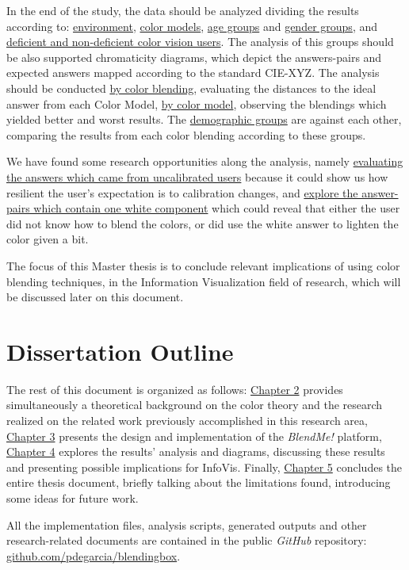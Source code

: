 %
In the end of the study, the data should be analyzed dividing the results according to: \ul{environment}, \ul{color
models}, \ul{age groups} and \ul{gender groups}, and \ul{deficient and non-deficient color vision users}. The analysis
of this groups should be also supported chromaticity diagrams, which depict the answers-pairs and expected answers
mapped according to the standard CIE-XYZ. The analysis should be conducted \ul{by color blending}, evaluating the distances
to the ideal answer from each Color Model, \ul{by color model}, observing the blendings which yielded better and worst
results. The \ul{demographic groups} are against each other, comparing the results from each color blending according
to these groups. \par
%
We have found some research opportunities along the analysis, namely \ul{evaluating the answers which came from
uncalibrated users} because it could show us how resilient the user's expectation is to calibration changes, and \ul{explore
the answer-pairs which contain one white component} which could reveal that either the user did not know how to blend
the colors, or did use the white answer to lighten the color given a bit. \par
%
The focus of this Master thesis is to conclude relevant implications of using color blending techniques, in the Information
Visualization field of research, which will be discussed later on this document.
%
\section{Dissertation Outline}
%
The rest of this document is organized as follows: \ul{Chapter 2} provides simultaneously a theoretical background on the
color theory and the research realized on the related work previously accomplished in this research area, \ul{Chapter 3}
presents the design and implementation of the \emph{BlendMe!} platform, \ul{Chapter 4} explores the results' analysis and
diagrams, discussing these results and presenting possible implications for InfoVis. Finally, \ul{Chapter 5} concludes the
entire thesis document, briefly talking about the limitations found, introducing some ideas for future work. \par
%
All the implementation files, analysis scripts, generated outputs and other research-related documents are contained in the
public \emph{GitHub} repository: \url{github.com/pdegarcia/blendingbox}.
%
